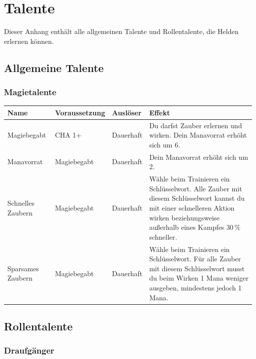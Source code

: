 \chapter{Talente}

Dieser Anhang enthält alle allgemeinen Talente und Rollentalente, die Helden erlernen können.

\section{Allgemeine Talente}

\subsection{Magietalente}

\begin{tabularx}{\textwidth}{p{3.0cm} p{2.8cm} p{2.2cm} X}
\textbf{Name} & \textbf{Voraussetzung} & \textbf{Auslöser} & \textbf{Effekt} \\
\hline
Magiebegabt & CHA 1+ & Dauerhaft & Du darfst Zauber erlernen und wirken. Dein Manavorrat erhöht sich um 6. \\
Manavorrat & Magiebegabt & Dauerhaft & Dein Manavorrat erhöht sich um 2. \\
Schnelles Zaubern & Magiebegabt & Dauerhaft & Wähle beim Trainieren ein Schlüsselwort. Alle Zauber mit diesem Schlüsselwort kannst du mit einer schnelleren Aktion wirken beziehungsweise außerhalb eines Kampfes 30\,\% schneller. \\
Sparsames Zaubern & Magiebegabt & Dauerhaft & Wähle beim Trainieren ein Schlüsselwort. Für alle Zauber mit diesem Schlüsselwort musst du beim Wirken 1 Mana weniger ausgeben, mindestens jedoch 1 Mana. \\
\end{tabularx}

\section{Rollentalente}

\subsection{Draufgänger}

